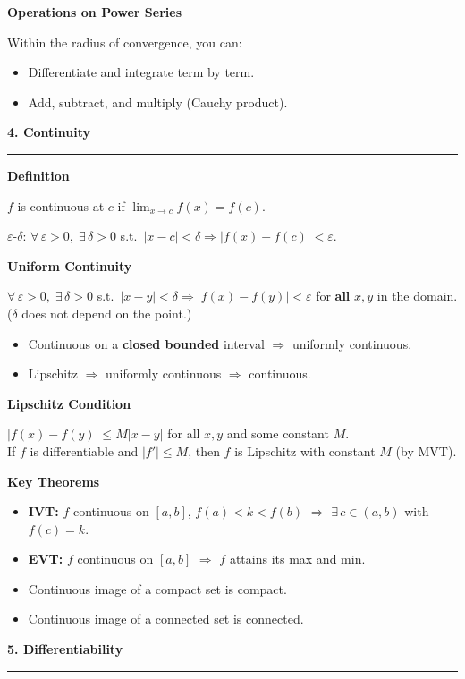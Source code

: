 \documentclass[10pt,twocolumn]{article}
\newcommand{\sect}[1]{\medskip\noindent\textbf{\large #1}\medskip\hrule\smallskip}
\newcommand{\subsect}[1]{\smallskip\noindent\textbf{#1}\par}
\begin{document}
\subsect{Operations on Power Series}
Within the radius of convergence, you can:
\begin{itemize}[nosep,leftmargin=*]
\item Differentiate and integrate term by term.
\item Add, subtract, and multiply (Cauchy product).
\end{itemize}

\sect{4. Continuity}

\subsect{Definition}
$f$ is continuous at $c$ if $\lim_{x\to c}f(x)=f(c)$.

$\varepsilon$-$\delta$: $\forall\,\varepsilon>0,\;\exists\,\delta>0$ s.t.\ $|x-c|<\delta\Rightarrow|f(x)-f(c)|<\varepsilon$.

\subsect{Uniform Continuity}
$\forall\,\varepsilon>0,\;\exists\,\delta>0$ s.t.\ $|x-y|<\delta\Rightarrow|f(x)-f(y)|<\varepsilon$ for \textbf{all} $x,y$ in the domain. ($\delta$ does not depend on the point.)

\begin{itemize}[nosep,leftmargin=*]
\item Continuous on a \textbf{closed bounded} interval $\Rightarrow$ uniformly continuous.
\item Lipschitz $\Rightarrow$ uniformly continuous $\Rightarrow$ continuous.
\end{itemize}

\subsect{Lipschitz Condition}
$|f(x)-f(y)|\le M|x-y|$ for all $x,y$ and some constant $M$.\\
If $f$ is differentiable and $|f'|\le M$, then $f$ is Lipschitz with constant $M$ (by MVT).

\subsect{Key Theorems}
\begin{itemize}[nosep,leftmargin=*]
\item \textbf{IVT:} $f$ continuous on $[a,b]$, $f(a)<k<f(b)$ $\Rightarrow$ $\exists\,c\in(a,b)$ with $f(c)=k$.
\item \textbf{EVT:} $f$ continuous on $[a,b]$ $\Rightarrow$ $f$ attains its max and min.
\item Continuous image of a compact set is compact.
\item Continuous image of a connected set is connected.
\end{itemize}

\sect{5. Differentiability}
\end{document}
